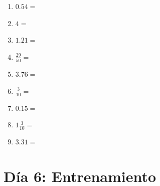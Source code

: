 \documentclass[12pt]{article}
\begin{document}
\begin{enumerate}
\item \large $ 0.54 = $ \vspace{1.5cm}
\item \large $ 4 = $ \vspace{1.5cm}
\item \large $ 1.21 = $ \vspace{1.5cm}
\item \large $ \frac{29}{50} = $ \vspace{1.5cm}
\item \large $ 3.76 = $ \vspace{1.5cm}
\item \large $ \frac{3}{10} = $ \vspace{1.5cm}
\item \large $ 0.15 = $ \vspace{1.5cm}
\item \large $ 1 \frac{3}{10} = $ \vspace{1.5cm}
\item \large $ 3.31 = $ \vspace{1.5cm}
\end{enumerate}\newpage
\section*{Día 6: Entrenamiento}
\end{document}
